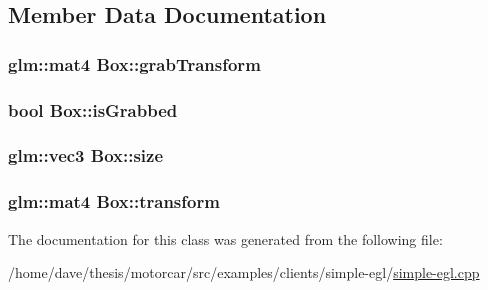 \subsection{Member Data Documentation}
\hypertarget{classBox_ae8b804e1de0abbf9dacf1429a8ffc523}{
\subsubsection[{grab\-Transform}]{\setlength{\rightskip}{0pt plus 5cm}glm\-::mat4 Box\-::grab\-Transform}}\label{classBox_ae8b804e1de0abbf9dacf1429a8ffc523}
\hypertarget{classBox_ab56163a3852271ff21236267bb55e6d5}{
\subsubsection[{is\-Grabbed}]{\setlength{\rightskip}{0pt plus 5cm}bool Box\-::is\-Grabbed}}\label{classBox_ab56163a3852271ff21236267bb55e6d5}
\hypertarget{classBox_a07840041729d30aa0ad28da68ed0d80a}{
\subsubsection[{size}]{\setlength{\rightskip}{0pt plus 5cm}glm\-::vec3 Box\-::size}}\label{classBox_a07840041729d30aa0ad28da68ed0d80a}
\hypertarget{classBox_a1c4ecc1b7eb6717d29022bdb80506b8b}{
\subsubsection[{transform}]{\setlength{\rightskip}{0pt plus 5cm}glm\-::mat4 Box\-::transform}}\label{classBox_a1c4ecc1b7eb6717d29022bdb80506b8b}


The documentation for this class was generated from the following file\-:\begin{DoxyCompactItemize}
\item 
/home/dave/thesis/motorcar/src/examples/clients/simple-\/egl/\hyperlink{simple-egl_8cpp}{simple-\/egl.\-cpp}\end{DoxyCompactItemize}
